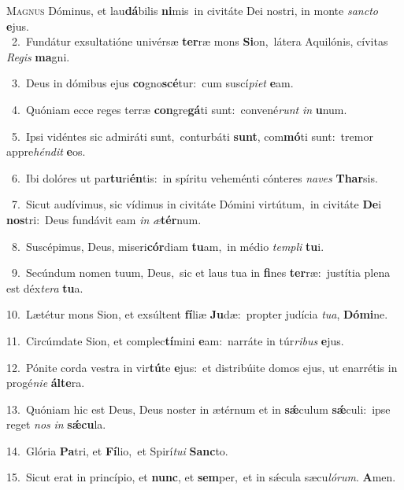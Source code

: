 \lettrine{\initial\textcolor{\initialcolor}{M}}{agnus} Dóminus, et lau\-\textbf{dá}\-bilis \textbf{ni}\-mis~\star in civitáte Dei nostri, in monte \textit{sanc}\-\textit{to} \textbf{e}\-jus.\\
{\numbfont\textcolor{\numbcolor}{~2.}}~Fundátur exsultatióne univérsæ \textbf{ter}\-ræ mons \textbf{Si}\-on,~\star látera Aquilónis, cívitas \textit{Re}\-\textit{gis} \textbf{ma}\-gni.\par
{\numbfont\textcolor{\numbcolor}{~3.}}~Deus in dómibus ejus \textbf{co}\-gno\-\textbf{scé}\-tur:~\star cum suscí\-\textit{pi}\-\textit{et} \textbf{e}\-am.\par
{\numbfont\textcolor{\numbcolor}{~4.}}~Quóniam ecce reges terræ \textbf{con}\-gre\-\textbf{gá}\-ti sunt:~\star convené\textit{runt} \textit{in} \textbf{u}\-num.\par
{\numbfont\textcolor{\numbcolor}{~5.}}~Ipsi vidéntes sic admiráti sunt,~\dagger conturbáti \textbf{sunt}\-, com\-\textbf{mó}\-ti sunt:~\star tremor appre\-\textit{hén}\-\textit{dit} \textbf{e}\-os.\par
{\numbfont\textcolor{\numbcolor}{~6.}}~Ibi dolóres ut par\-\textbf{tu}\-ri\-\textbf{én}\-tis:~\star in spíritu veheménti cónteres \textit{na}\-\textit{ves} \textbf{Thar}\-sis.\par
{\numbfont\textcolor{\numbcolor}{~7.}}~Sicut audívimus, sic vídimus in civitáte Dómini virtútum,~\dagger in civitáte \textbf{De}\-i \textbf{nos}\-tri:~\star Deus fundávit eam \textit{in} \textit{æ}\-\textbf{tér}num.\par
{\numbfont\textcolor{\numbcolor}{~8.}}~Suscépimus, Deus, miseri\-\textbf{cór}\-diam \textbf{tu}\-am,~\star in médio \textit{tem}\-\textit{pli} \textbf{tu}\-i.\par
{\numbfont\textcolor{\numbcolor}{~9.}}~Secúndum nomen tuum, Deus,~\dagger sic et laus tua in \textbf{fi}\-nes \textbf{ter}\-ræ:~\star justítia plena est déx\-\textit{te}\-\textit{ra} \textbf{tu}\-a.\par
{\numbfont\textcolor{\numbcolor}{10.}}~Lætétur mons Sion, et exsúltent \textbf{fí}\-liæ \textbf{Ju}\-dæ:~\star propter judícia \textit{tu}\-\textit{a}, \textbf{Dó}\-\textbf{mi}ne.\par
{\numbfont\textcolor{\numbcolor}{11.}}~Circúmdate Sion, et complec\-\textbf{tí}\-mini \textbf{e}\-am:~\star narráte in túr\-\textit{ri}\-\textit{bus} \textbf{e}\-jus.\par
{\numbfont\textcolor{\numbcolor}{12.}}~Pónite corda vestra in vir\-\textbf{tú}\-te \textbf{e}\-jus:~\star et distribúite domos ejus, ut enarrétis in progé\-\textit{ni}\-\textit{e} \textbf{ál}\-\textbf{te}ra.\par
{\numbfont\textcolor{\numbcolor}{13.}}~Quóniam hic est Deus, Deus noster in ætérnum et in \textbf{sǽ}\-culum \textbf{sǽ}\-culi:~\star ipse reget \textit{nos} \textit{in} \textbf{sǽ}\-\textbf{cu}la.\par
{\numbfont\textcolor{\numbcolor}{14.}}~Glória \textbf{Pa}\-tri, et \textbf{Fí}\-lio,~\star et Spirí\-\textit{tu}\-\textit{i} \textbf{Sanc}\-to.\par
{\numbfont\textcolor{\numbcolor}{15.}}~Sicut erat in princípio, et \textbf{nunc}\-, et \textbf{sem}\-per,~\star et in sǽcula sæcu\-\textit{ló}\-\textit{rum}. \textbf{A}\-men.\par
